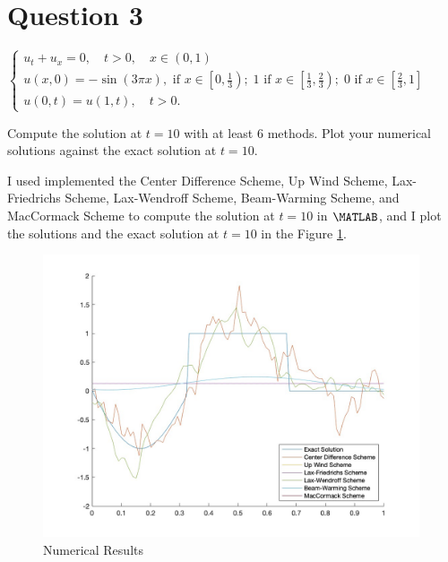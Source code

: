 \section{Question 3}

\begin{question}
   $\left\{\begin{array}{l}u_t+u_x=0, \quad t>0, \quad x \in(0,1) \\ u(x, 0)=-\sin (3 \pi x), \text{ if } x \in\left[0, \frac{1}{3}\right) ; \; 1 \text { if } x \in\left[\frac{1}{3}, \frac{2}{3}\right) ; \; 0 \text{ if } x \in\left[\frac{2}{3}, 1\right] \\ u(0, t)=u(1, t), \quad t>0 .\end{array}\right.$
   
    Compute the solution at $t=10$ with at least 6 methods. Plot your numerical solutions against the exact solution at $t=10$.
\end{question}

\begin{answer}
    I used implemented the Center Difference Scheme, Up Wind Scheme, Lax-Friedrichs Scheme, Lax-Wendroff Scheme, Beam-Warming Scheme, and MacCormack Scheme to compute the solution at $t = 10$ in $\MATLAB$, and I plot the solutions and the exact solution at $t = 10$ in the Figure \ref{fig:fig1}.
    \begin{figure}[H]
        \centering
        \includegraphics[width=0.99\textwidth]{Result.jpg}
        \caption{\label{fig:fig1}Numerical Results}
    \end{figure}
\end{answer}